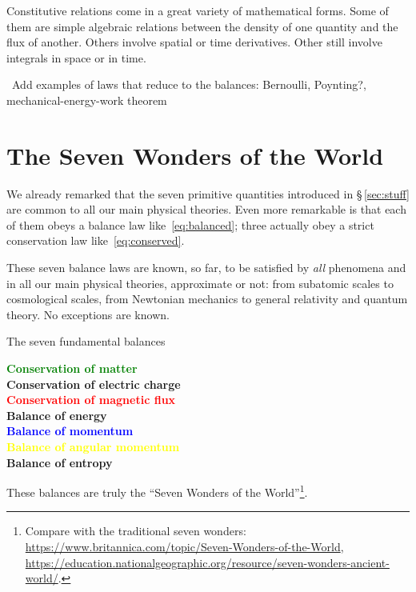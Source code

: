 \documentclass[a4paper,12pt,%
onecolumn,oneside,titlepage,%
british%
]{memoir}
\newcommand{\mynotew}[1]{{\footnotesize\color{midgrey}\faIcon{tools}\ #1}}
\renewcommand*{\|}[1][]{\nonscript\:#1\vert\nonscript\:\mathopen{}}
\newcommand*{\sect}{\S}%
\begin{document}
Constitutive relations come in a great variety of mathematical forms. Some of them are simple algebraic relations between the density of one quantity and the flux of another. Others involve spatial or time derivatives. Other still involve integrals in space or in time.%

\mynotew{Add examples of laws that reduce to the balances: Bernoulli, Poynting?, mechanical-energy-work theorem}



\printpagenotes*
\clearpage

\chapter{The Seven Wonders of the World}
\label{cha:seven_wonders}

We already remarked that the seven primitive quantities introduced in \sect\,\ref{sec:stuff} are common to all our main physical theories. Even more remarkable is that each of them obeys a balance law like~\eqref{eq:balanced}; three actually obey a strict conservation law like~\eqref{eq:conserved}.

These seven balance laws are known, so far, to be satisfied by \emph{all} phenomena and in all our main physical theories, approximate or not: from subatomic scales to cosmological scales, from Newtonian mechanics to general relativity and quantum theory. No exceptions are known.
\begin{definition}{The seven fundamental balances}
  \begin{center}\bfseries
    \textcolor{green}{Conservation of matter}
\\ \textcolor{redpurple}{Conservation of electric charge}
\\ \textcolor{red}{Conservation of magnetic flux}
\\ \textcolor{bluepurple}{Balance of energy}
\\ \textcolor{blue}{Balance of momentum}
\\ \textcolor{yellow}{Balance of angular momentum}
\\ \textcolor{midgrey}{Balance of entropy}
  \end{center}
\end{definition}
These balances are truly the \enquote{Seven Wonders of the World}\footnote{Compare with the traditional seven wonders: \url{https://www.britannica.com/topic/Seven-Wonders-of-the-World}, \url{https://education.nationalgeographic.org/resource/seven-wonders-ancient-world/}.}.
\end{document}
